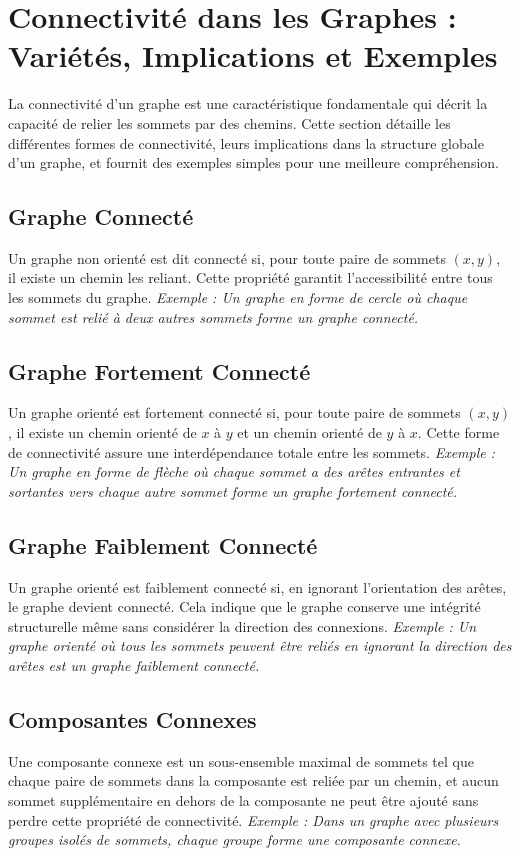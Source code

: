 \section{Connectivité dans les Graphes : Variétés, Implications et Exemples}

La connectivité d'un graphe est une caractéristique fondamentale qui décrit la capacité de relier les sommets par des chemins. Cette section détaille les différentes formes de connectivité, leurs implications dans la structure globale d'un graphe, et fournit des exemples simples pour une meilleure compréhension.

\subsection{Graphe Connecté}
Un graphe non orienté est dit connecté si, pour toute paire de sommets \( (x, y) \), il existe un chemin les reliant. Cette propriété garantit l'accessibilité entre tous les sommets du graphe.
\textit{Exemple : Un graphe en forme de cercle où chaque sommet est relié à deux autres sommets forme un graphe connecté.}

\subsection{Graphe Fortement Connecté}
Un graphe orienté est fortement connecté si, pour toute paire de sommets \( (x, y) \), il existe un chemin orienté de \( x \) à \( y \) et un chemin orienté de \( y \) à \( x \). Cette forme de connectivité assure une interdépendance totale entre les sommets.
\textit{Exemple : Un graphe en forme de flèche où chaque sommet a des arêtes entrantes et sortantes vers chaque autre sommet forme un graphe fortement connecté.}

\subsection{Graphe Faiblement Connecté}
Un graphe orienté est faiblement connecté si, en ignorant l'orientation des arêtes, le graphe devient connecté. Cela indique que le graphe conserve une intégrité structurelle même sans considérer la direction des connexions.
\textit{Exemple : Un graphe orienté où tous les sommets peuvent être reliés en ignorant la direction des arêtes est un graphe faiblement connecté.}

\subsection{Composantes Connexes}
Une composante connexe est un sous-ensemble maximal de sommets tel que chaque paire de sommets dans la composante est reliée par un chemin, et aucun sommet supplémentaire en dehors de la composante ne peut être ajouté sans perdre cette propriété de connectivité.
\textit{Exemple : Dans un graphe avec plusieurs groupes isolés de sommets, chaque groupe forme une composante connexe.}

